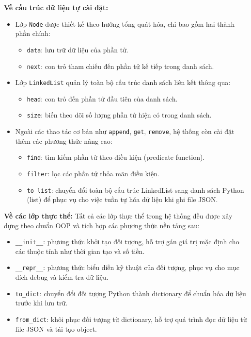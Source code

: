 \documentclass[12pt,letterpaper]{article}
\begin{document}
\vspace{0.3cm}
\textbf{Về cấu trúc dữ liệu tự cài đặt:}
\begin{itemize}
    \item Lớp \texttt{Node} được thiết kế theo hướng tổng quát hóa, chỉ bao gồm hai thành phần chính:
    \begin{itemize}
        \item \texttt{data}: lưu trữ dữ liệu của phần tử.
        \item \texttt{next}: con trỏ tham chiếu đến phần tử kế tiếp trong danh sách.
    \end{itemize}

    \item Lớp \texttt{LinkedList} quản lý toàn bộ cấu trúc danh sách liên kết thông qua:
    \begin{itemize}
        \item \texttt{head}: con trỏ đến phần tử đầu tiên của danh sách.
        \item \texttt{size}: biến theo dõi số lượng phần tử hiện có trong danh sách.
    \end{itemize}

    \item Ngoài các thao tác cơ bản như \texttt{append}, \texttt{get}, \texttt{remove}, hệ thống còn cài đặt thêm các phương thức nâng cao:
    \begin{itemize}
        \item \texttt{find}: tìm kiếm phần tử theo điều kiện (predicate function).
        \item \texttt{filter}: lọc các phần tử thỏa mãn điều kiện.
        \item \texttt{to\_list}: chuyển đổi toàn bộ cấu trúc LinkedList sang danh sách Python (list) 
        để phục vụ cho việc tuần tự hóa dữ liệu khi ghi file JSON.
    \end{itemize}
\end{itemize}

\vspace{0.3cm}
\textbf{Về các lớp thực thể:}
Tất cả các lớp thực thể trong hệ thống đều được xây dựng theo chuẩn OOP và tích hợp các phương thức nền tảng sau:

\begin{itemize}
    \item \texttt{\_\_init\_\_}: phương thức khởi tạo đối tượng, hỗ trợ gán giá trị mặc định cho các thuộc tính như thời gian tạo và số tiền.
    
    \item \texttt{\_\_repr\_\_}: phương thức biểu diễn kỹ thuật của đối tượng, phục vụ cho mục đích debug và kiểm tra dữ liệu.
    
    \item \texttt{to\_dict}: chuyển đổi đối tượng Python thành dictionary để chuẩn hóa dữ liệu trước khi lưu trữ.
    
    \item \texttt{from\_dict}: khôi phục đối tượng từ dictionary, hỗ trợ quá trình đọc dữ liệu từ file JSON và tái tạo object.
\end{itemize}
\end{document}
